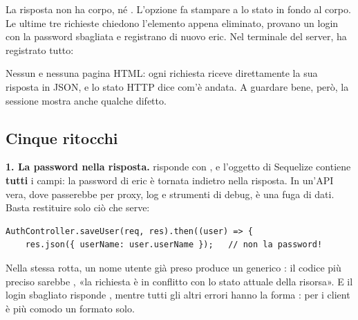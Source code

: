 La risposta  non ha corpo, né . L'opzione
 fa stampare a  lo
stato in fondo al corpo. Le ultime tre richieste chiedono l'elemento appena
eliminato, provano un login con la password sbagliata e registrano di nuovo
eric. Nel terminale del server,  ha registrato tutto:


Nessun  e nessuna pagina HTML: ogni richiesta riceve direttamente la
sua risposta in JSON, e lo stato HTTP dice com'è andata. A guardare bene, però,
la sessione mostra anche qualche difetto.

\subsection{Cinque ritocchi}

\textbf{1. La password nella risposta.}  risponde con
, e l'oggetto di Sequelize contiene \textbf{tutti} i
campi: la password di eric è tornata indietro nella risposta. In un'API vera,
dove passerebbe per proxy, log e strumenti di debug, è una fuga di dati. Basta
restituire solo ciò che serve:

\begin{lstlisting}[style=js, name=routes/authenticationRouter.js, firstnumber=17]
  AuthController.saveUser(req, res).then((user) => {
    res.json({ userName: user.userName });   // non la password!
\end{lstlisting}

Nella stessa rotta, un nome utente già preso produce un generico :
il codice più preciso sarebbe , «la richiesta è in conflitto
con lo stato attuale della risorsa». E il login sbagliato risponde
, mentre tutti gli altri errori hanno la forma
: per i client è più comodo un formato solo.

